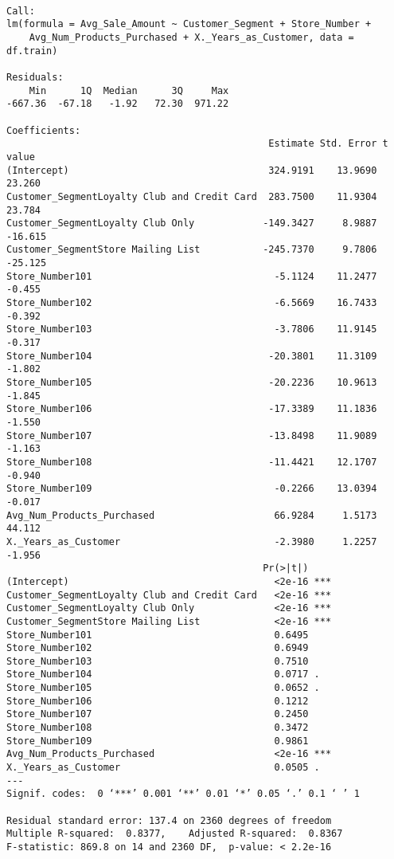 \documentclass[11pt]{article}
\begin{document}
    
    \begin{verbatim}

Call:
lm(formula = Avg_Sale_Amount ~ Customer_Segment + Store_Number + 
    Avg_Num_Products_Purchased + X._Years_as_Customer, data = df.train)

Residuals:
    Min      1Q  Median      3Q     Max 
-667.36  -67.18   -1.92   72.30  971.22 

Coefficients:
                                              Estimate Std. Error t value
(Intercept)                                   324.9191    13.9690  23.260
Customer_SegmentLoyalty Club and Credit Card  283.7500    11.9304  23.784
Customer_SegmentLoyalty Club Only            -149.3427     8.9887 -16.615
Customer_SegmentStore Mailing List           -245.7370     9.7806 -25.125
Store_Number101                                -5.1124    11.2477  -0.455
Store_Number102                                -6.5669    16.7433  -0.392
Store_Number103                                -3.7806    11.9145  -0.317
Store_Number104                               -20.3801    11.3109  -1.802
Store_Number105                               -20.2236    10.9613  -1.845
Store_Number106                               -17.3389    11.1836  -1.550
Store_Number107                               -13.8498    11.9089  -1.163
Store_Number108                               -11.4421    12.1707  -0.940
Store_Number109                                -0.2266    13.0394  -0.017
Avg_Num_Products_Purchased                     66.9284     1.5173  44.112
X._Years_as_Customer                           -2.3980     1.2257  -1.956
                                             Pr(>|t|)    
(Intercept)                                    <2e-16 ***
Customer_SegmentLoyalty Club and Credit Card   <2e-16 ***
Customer_SegmentLoyalty Club Only              <2e-16 ***
Customer_SegmentStore Mailing List             <2e-16 ***
Store_Number101                                0.6495    
Store_Number102                                0.6949    
Store_Number103                                0.7510    
Store_Number104                                0.0717 .  
Store_Number105                                0.0652 .  
Store_Number106                                0.1212    
Store_Number107                                0.2450    
Store_Number108                                0.3472    
Store_Number109                                0.9861    
Avg_Num_Products_Purchased                     <2e-16 ***
X._Years_as_Customer                           0.0505 .  
---
Signif. codes:  0 ‘***’ 0.001 ‘**’ 0.01 ‘*’ 0.05 ‘.’ 0.1 ‘ ’ 1

Residual standard error: 137.4 on 2360 degrees of freedom
Multiple R-squared:  0.8377,	Adjusted R-squared:  0.8367 
F-statistic: 869.8 on 14 and 2360 DF,  p-value: < 2.2e-16

    \end{verbatim}
\end{document}
